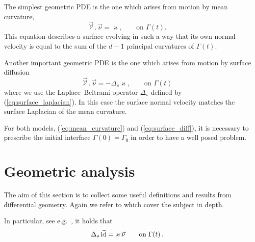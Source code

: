 The simplest geometric PDE is the one which arises from motion by mean
curvature,
\begin{equation}\label{eq:mean_curvature}
\vec{\mathcal{V}}\,.\,\vec\nu=\varkappa,\qquad\mbox{on }\Gamma(t).
\end{equation}
This equation describes a surface evolving in such a way that its own normal
velocity is equal to the sum of the $d-1$ principal curvatures of $\Gamma(t)$.

Another important geometric PDE is the one which arises from motion by
surface diffusion
\begin{equation}\label{eq:surface_diff}
\vec{\mathcal{V}}\,.\,\vec\nu=-\Delta_s \varkappa, \qquad\mbox{on }\Gamma(t)
\end{equation}
where we use the Laplace--Beltrami operator $\Delta_s$ defined by
(\ref{eq:surface_laplacian}). In this case the surface normal velocity matches
the surface Laplacian of the mean curvature.

For both models, (\ref{eq:mean_curvature}) and (\ref{eq:surface_diff}), it is
necessary to prescribe the initial interface $\Gamma(0)=\Gamma_0$ in order to
have a well posed problem.

\section[Geometric Analysis]{Geometric analysis}
The aim of this section is to collect some useful definitions and results from
differential geometry. Again we refer to \cite{DeckelnickDE05} which cover the
subject in depth.

In particular, see e.g.\ \cite{DeckelnickDE05}, it holds that
\begin{equation} \label{eq:LBop}
\Delta_s\, \vec {\rm id} = \varkappa\, \vec\nu \qquad \mbox{on $\Gamma(t)$}\,.
\end{equation}

